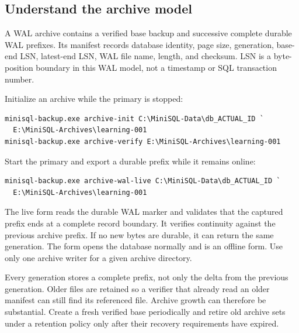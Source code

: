 \subsection{Understand the archive model}

A WAL archive contains a verified base backup and successive complete durable
WAL prefixes. Its manifest records database identity, page size, generation,
base-end LSN, latest-end LSN, WAL file name, length, and checksum. LSN is a
byte-position boundary in this WAL model, not a timestamp or SQL transaction
number.

Initialize an archive while the primary is stopped:

\begin{lstlisting}
minisql-backup.exe archive-init C:\MiniSQL-Data\db_ACTUAL_ID `
  E:\MiniSQL-Archives\learning-001
minisql-backup.exe archive-verify E:\MiniSQL-Archives\learning-001
\end{lstlisting}

Start the primary and export a durable prefix while it remains online:

\begin{lstlisting}
minisql-backup.exe archive-wal-live C:\MiniSQL-Data\db_ACTUAL_ID `
  E:\MiniSQL-Archives\learning-001
\end{lstlisting}

The live form reads the durable WAL marker and validates that the captured
prefix ends at a complete record boundary. It verifies continuity against
the previous archive prefix. If no new bytes are durable, it can return the
same generation. The  form opens the database normally
and is an offline form. Use only one archive writer for a given archive
directory.

Every generation stores a complete prefix, not only the delta from the
previous generation. Older files are retained so a verifier that already
read an older manifest can still find its referenced file. Archive growth
can therefore be substantial. Create a fresh verified base periodically and
retire old archive sets under a retention policy only after their recovery
requirements have expired.


